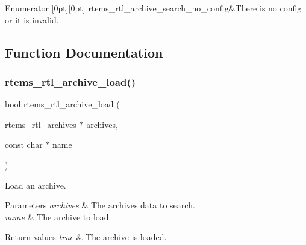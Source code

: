 \begin{DoxyEnumFields}{Enumerator}
[0pt][0pt]{}\mbox{\label{rtl-archive_8h_a82930c14e64f3f5853052e84af4a6c2eab5896674df6ee65d59f5f521b1bbc9d9}} 
rtems\+\_\+rtl\+\_\+archive\+\_\+search\+\_\+no\+\_\+config&There is no config or it is invalid. \\
\hline

\end{DoxyEnumFields}


\subsection{Function Documentation}
\mbox{\label{rtl-archive_8h_aec513bfd77432b5004d1a4ed91b7bc3d}} 
\subsubsection{\texorpdfstring{rtems\_rtl\_archive\_load()}{rtems\_rtl\_archive\_load()}}
{\footnotesize\ttfamily bool rtems\+\_\+rtl\+\_\+archive\+\_\+load (\begin{DoxyParamCaption}\item[{\mbox{\hyperlink{structrtems__rtl__archives}{rtems\+\_\+rtl\+\_\+archives}} $\ast$}]{archives,  }\item[{const char $\ast$}]{name }\end{DoxyParamCaption})}

Load an archive.


\begin{DoxyParams}{Parameters}
{\em archives} & The archives data to search. \\
\hline
{\em name} & The archive to load. \\
\hline
\end{DoxyParams}

\begin{DoxyRetVals}{Return values}
{\em true} & The archive is loaded. \\
\hline
\end{DoxyRetVals}
\mbox{\label{rtl-archive_8h_a48e3be1af298eca62a62e5f1bc72c916}} 
